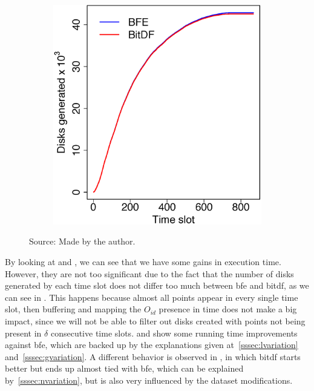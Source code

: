 {\begin{figure}[h!]
\begin{subfigure}[t]{0.48\textwidth}
        \includegraphics[width=\textwidth]{images/Trucks_d.eps}
        \label{fig:trucks_disks}
    \end{subfigure}
    \footnotesize{Source: Made by the author.}
    \label{fig:trucks_results2}
\end{figure}

By looking at  and , we can see that we have some gains in
execution time. However, they are not too significant due to the fact that the number of disks generated by each time
slot does not differ too much between \ac{bfe} and \ac{bitdf}, as we can see in . This happens
because almost all points appear in every single time slot, then buffering and mapping the $O_{id}$ presence in time
does not make a big impact, since we will not be able to filter out disks created with points not being present in
$\delta$ consecutive time slots.   and  show some running time
improvements against \ac{bfe}, which are backed up by the explanations given at~\ref{sssec:lvariation}
and~\ref{sssec:gvariation}. A different behavior is observed in , in which \ac{bitdf} starts
better but ends up almost tied with \ac{bfe}, which can be explained by~\ref{sssec:nvariation}, but is also very
influenced by the dataset modifications.

}
